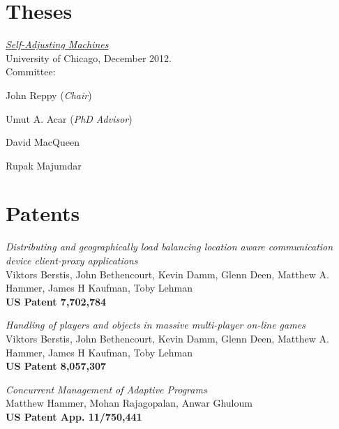 \documentclass[10pt,letterpaper]{article}
\renewenvironment{itemize}{
  \begin{list}{}{
    \setlength{\leftmargin}{1.5em}
    \setlength{\itemsep}{0.25em}
    \setlength{\parskip}{0pt}
    \setlength{\parsep}{0.25em}
  }
}{
  \end{list}
}
\begin{document}
\section*{Theses}

\begin{itemize}
\item
\href{http://www.cs.umd.edu/~hammer/selfadjmachines}
{\textit{Self-Adjusting Machines}}
\\
University of Chicago, December 2012.
\\
Committee:
\begin{itemize}
\item John Reppy (\textit{Chair})
\item Umut A. Acar (\textit{PhD Advisor})
\item David MacQueen
\item Rupak Majumdar
\end{itemize}
\end{itemize}

\section*{Patents}

\begin{itemize}

  
\item
\textit{Distributing and geographically load balancing location aware communication device client-proxy applications}
\\
  Viktors Berstis, John Bethencourt, Kevin Damm, Glenn Deen, Matthew A. Hammer, James H Kaufman, Toby Lehman
\\
\textbf{US Patent 7,702,784}

\item
\textit{Handling of players and objects in massive multi-player on-line games}
\\
  Viktors Berstis, John Bethencourt, Kevin Damm, Glenn Deen, Matthew A. Hammer, James H Kaufman, Toby Lehman
\\
\textbf{US Patent 8,057,307}

\item
\textit{Concurrent Management of Adaptive Programs}
\\
Matthew Hammer, Mohan Rajagopalan, Anwar Ghuloum
\\
\textbf{US Patent App. 11/750,441}

\end{itemize}
\end{document}
